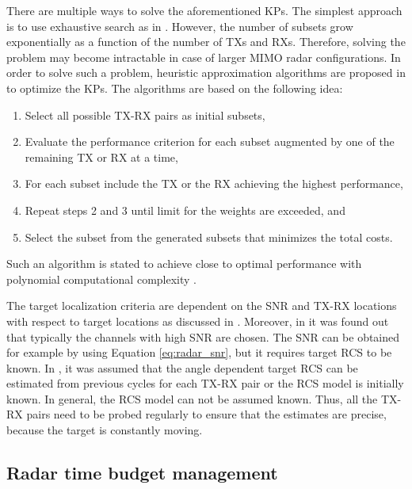 \documentclass[english, 12pt, a4paper, elec, utf8, a-1b, online]{aaltothesis}
\begin{document}
There are multiple ways to solve the aforementioned KPs.
The simplest approach is to use exhaustive search as in \cite{Sun2014}.
However, the number of subsets grow exponentially as a function of the number of TXs and RXs.
Therefore, solving the problem may become intractable in case of larger MIMO radar configurations.
In order to solve such a problem, heuristic approximation algorithms are proposed in \cite{Godrich2011a, Godrich2011} to optimize the KPs.
The algorithms are based on the following idea:
\begin{enumerate}
    \item Select all possible TX-RX pairs as initial subsets,
    \item Evaluate the performance criterion for each subset augmented by one of the remaining TX or RX at a time, 
    \item For each subset include the TX or the RX achieving the highest performance,
    \item Repeat steps 2 and 3 until limit for the weights are exceeded, and
    \item Select the subset from the generated subsets that minimizes the total costs. 
\end{enumerate}
Such an algorithm is stated to achieve close to optimal performance with polynomial computational complexity \cite{Godrich2011a, Godrich2011}.

The target localization criteria are dependent on the SNR and TX-RX locations with respect to target locations as discussed in \cite{Sun2014}.
Moreover, in \cite{Sun2014} it was found out that typically the channels with high SNR are chosen.
The SNR can be obtained for example by using Equation \eqref{eq:radar_snr}, but it requires target RCS to be known.
In \cite{Godrich2011a, Godrich2011, Sun2014}, it was assumed that the angle dependent target RCS can be estimated from previous cycles for each TX-RX pair or the RCS model is initially known.
In general, the RCS model can not be assumed known. 
Thus, all the TX-RX pairs need to be probed regularly to ensure that the estimates are precise, because the target is constantly moving.


\subsection{Radar time budget management} \label{sec:tbm}
\end{document}
